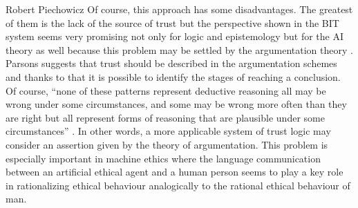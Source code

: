 \begin{artengenv}{Robert Piechowicz}
Of course, this approach has some disadvantages. The greatest of them is the lack of the source of trust but the perspective shown in the BIT system seems very promising not only for logic and epistemology but for the AI theory as well because this problem may be settled by the argumentation theory
\parencite{parsons_argument_2014}.
Parsons suggests that trust should be described in the argumentation schemes and thanks to that it is possible to identify the stages of reaching a conclusion. Of course, ``none of these patterns represent deductive reasoning all may be wrong under some circumstances, and some may be wrong more often than they are right but all represent forms of reasoning that are plausible under some circumstances''
\parencite{parsons_argument_2014}.
In other words, a more applicable system of trust logic may consider an assertion given by the theory of argumentation. This problem is especially important in machine ethics where the language communication between an artificial ethical agent and a human person seems to play a key role in rationalizing ethical behaviour analogically to the rational ethical behaviour of man.




\end{artengenv}
